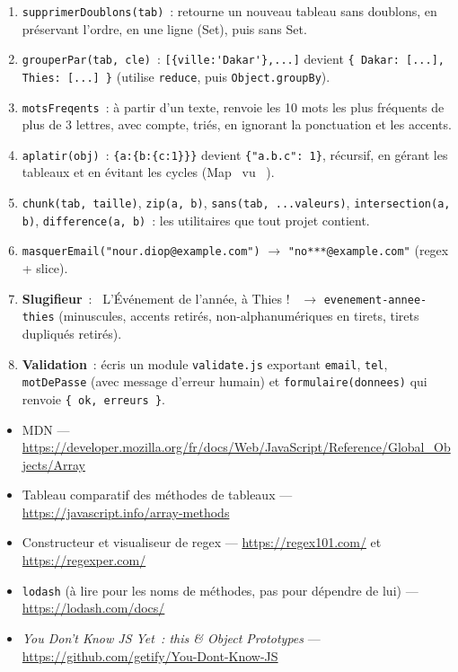 \documentclass[12pt,a4paper,twoside,openright]{book}
\begin{document}
\begin{exercice}
\begin{enumerate}
  \item \verb|supprimerDoublons(tab)|~: retourne un nouveau tableau sans doublons, en
        pr\'eservant l'ordre, en une ligne (Set), puis sans Set.
  \item \verb|grouperPar(tab, cle)|~: \verb|[{ville:'Dakar'},...]| devient
        \verb|{ Dakar: [...], Thies: [...] }| (utilise \verb|reduce|, puis \verb|Object.groupBy|).
  \item \verb|motsFreqents|~: \`a partir d'un texte, renvoie les 10 mots les plus fr\'equents de
        plus de 3 lettres, avec compte, tri\'es, en ignorant la ponctuation et les accents.
  \item \verb|aplatir(obj)|~: \verb|{a:{b:{c:1}}}| devient \verb|{"a.b.c": 1}|, r\'ecursif, en
        g\'erant les tableaux et en \'evitant les cycles (Map \og ~vu~ \fg{}).
  \item \verb|chunk(tab, taille)|, \verb|zip(a, b)|, \verb|sans(tab, ...valeurs)|,
        \verb|intersection(a, b)|, \verb|difference(a, b)|~: les utilitaires que tout projet contient.
  \item \verb|masquerEmail("nour.diop@example.com")| $\rightarrow$ \verb|"no***@example.com"| (regex + slice).
  \item \textbf{Slugifieur}~: \og ~L'\'Ev\'enement de l'ann\'ee, \`a Thies !~ \fg{} $\rightarrow$ \verb|evenement-annee-thies|
        (minuscules, accents retir\'es, non-alphanum\'eriques en tirets, tirets dupliqu\'es retir\'es).
  \item \textbf{Validation}~: \'ecris un module \verb|validate.js| exportant \verb|email|,
        \verb|tel|, \verb|motDePasse| (avec message d'erreur humain) et \verb|formulaire(donnees)|
        qui renvoie \verb|{ ok, erreurs }|.
\end{enumerate}
\end{exercice}

\begin{ressources}
\begin{itemize}
  \item MDN --- \url{https://developer.mozilla.org/fr/docs/Web/JavaScript/Reference/Global_Objects/Array}
  \item Tableau comparatif des m\'ethodes de tableaux --- \url{https://javascript.info/array-methods}
  \item Constructeur et visualiseur de regex --- \url{https://regex101.com/} et \url{https://regexper.com/}
  \item \verb|lodash| (\`a lire pour les noms de m\'ethodes, pas pour d\'ependre de lui) --- \url{https://lodash.com/docs/}
  \item \emph{You Don't Know JS Yet~: this \& Object Prototypes} --- \url{https://github.com/getify/You-Dont-Know-JS}
\end{itemize}
\end{ressources}
\end{document}
